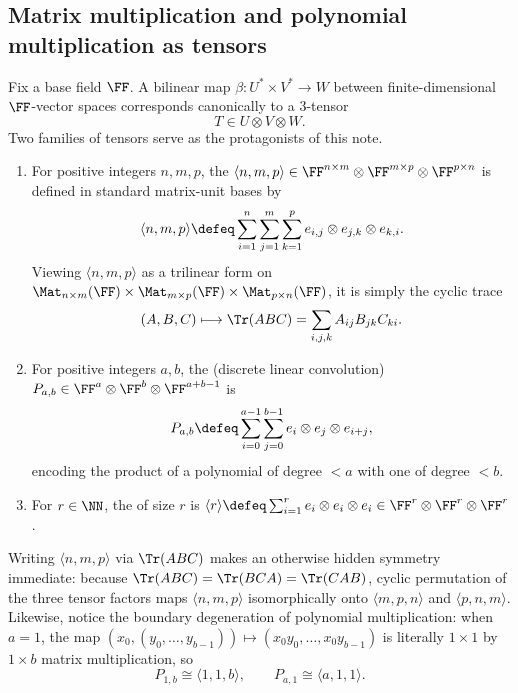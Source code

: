 \subsection{Matrix multiplication and polynomial multiplication as tensors}

Fix a base field \(\FF\). A bilinear map \(\beta : U^* \times V^* \to W\) between finite-dimensional \(\FF\)-vector spaces corresponds canonically to a \(3\)-tensor
\[
  T \in U \otimes V \otimes W.
\]
Two families of tensors serve as the protagonists of this note.

\begin{definition}
\label{def:mm-nine-fourths-two-tensors}
\begin{enumerate}
  \item For positive integers \(n, m, p\), the  \(\langle n, m, p \rangle \in \FF^{n\times m} \otimes \FF^{m\times p} \otimes \FF^{p\times n}\) is defined in standard matrix-unit bases by
  \[
    \langle n, m, p \rangle \defeq \sum_{i=1}^{n} \sum_{j=1}^{m} \sum_{k=1}^{p} e_{i,j} \otimes e_{j,k} \otimes e_{k,i}.
  \]
  Viewing \(\langle n, m, p \rangle\) as a trilinear form on \(\Mat_{n\times m}(\FF) \times \Mat_{m\times p}(\FF) \times \Mat_{p\times n}(\FF)\), it is simply the cyclic trace
  \[
    (A, B, C) \longmapsto \Tr(ABC) = \sum_{i,j,k} A_{ij} B_{jk} C_{ki}.
  \]
  \item For positive integers \(a, b\), the  (discrete linear convolution) \(P_{a,b} \in \FF^a \otimes \FF^b \otimes \FF^{a+b-1}\) is
  \[
    P_{a,b} \defeq \sum_{i=0}^{a-1} \sum_{j=0}^{b-1} e_i \otimes e_j \otimes e_{i+j},
  \]
  encoding the product of a polynomial of degree \(< a\) with one of degree \(< b\).
  \item For \(r \in \NN\), the  of size \(r\) is \(\langle r \rangle \defeq \sum_{i=1}^r e_i \otimes e_i \otimes e_i \in \FF^r \otimes \FF^r \otimes \FF^r\).
\end{enumerate}
\end{definition}

Writing \(\langle n, m, p \rangle\) via \(\Tr(ABC)\) makes an otherwise hidden symmetry immediate: because \(\Tr(ABC) = \Tr(BCA) = \Tr(CAB)\), cyclic permutation of the three tensor factors maps \(\langle n, m, p \rangle\) isomorphically onto \(\langle m, p, n \rangle\) and \(\langle p, n, m \rangle\). Likewise, notice the boundary degeneration of polynomial multiplication: when \(a = 1\), the map \((x_0, (y_0,\dots,y_{b-1})) \mapsto (x_0 y_0, \dots, x_0 y_{b-1})\) is literally \(1\times 1\) by \(1\times b\) matrix multiplication, so
\begin{equation}
  P_{1,b} \cong \langle 1, 1, b \rangle,
  \qquad
  P_{a,1} \cong \langle a, 1, 1 \rangle.
  \label{eq:mm-nine-fourths-P1b}
\end{equation}

